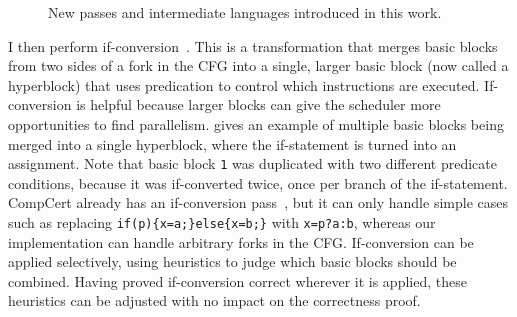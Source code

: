 \begin{figure}
\hypersetup{hidelinks}
\centering
{}
  \caption{New passes and intermediate languages introduced in this work.}%
  \label{fig:compcert_interm}
\end{figure}

I then perform if-conversion~\cite{allen83_conver_contr_depen_data_depen}. This
is a transformation that merges basic blocks from two sides of a fork in the CFG
into a single, larger basic block (now called a hyperblock) that uses
predication to control which instructions are executed.  If-conversion is
helpful because larger blocks can give the scheduler more opportunities to find
parallelism.   gives an example of
multiple \rtl{} basic blocks being merged into a single hyperblock, where the
if-statement is turned into an assignment.  Note that basic block \texttt{1} was
duplicated with two different predicate conditions, because it was if-converted
twice, once per branch of the if-statement.  CompCert already has an
if-conversion pass~\cite{absint19_compc}, but it can only handle simple cases
such as replacing \texttt{if(p)\{x=a;\}else\{x=b;\}} with \texttt{x=p?a:b},
whereas our implementation can handle arbitrary forks in the CFG.  If-conversion
can be applied selectively, using heuristics to judge which basic blocks should
be combined. Having proved if-conversion correct wherever it is applied, these
heuristics can be adjusted with no impact on the correctness proof.

